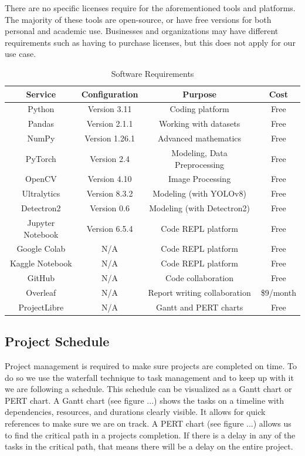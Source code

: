 \documentclass[stu,12pt,floatsintext]{apa7}
\begin{document}
There are no specific licenses require for the aforementioned tools and platforms. The majority of these tools are open-source, or have free versions for both personal and academic use. Businesses and organizations may have different requirements such as having to purchase licenses, but this does not apply for our use case. 

\begin{table}[!htb]
    \centering
    \caption{Software Requirements}
    \begin{tabular}{cccc}
    \hline
         Service& Configuration  &Purpose& Cost \\
         \hline
         Python & Version 3.11  &Coding platform& Free \\
         Pandas & Version 2.1.1  &Working with datasets& Free \\
         NumPy & Version 1.26.1  &Advanced mathematics& Free \\
         PyTorch & Version 2.4& Modeling, Data Preprocessing& Free\\
         OpenCV  & Version 4.10& Image Processing & Free\\
         Ultralytics & Version 8.3.2& Modeling (with YOLOv8)& Free\\
         Detectron2 & Version 0.6& Modeling (with Detectron2)& Free\\
         Jupyter Notebook & Version 6.5.4  &Code REPL platform& Free\\
         Google Colab & N/A  &Code REPL platform& Free\\
         Kaggle Notebook & N/A  &Code REPL platform& Free\\
         GitHub & N/A  &Code collaboration& Free \\
         Overleaf & N/A  &Report writing collaboration& \$9/month \\ 
         ProjectLibre & N/A  &Gantt and PERT charts& Free \\ 
         \hline
    \end{tabular}
    \label{tab:software}
\end{table}

\subsection{Project Schedule}

Project management is required to make sure projects are completed on time. To do so we use the waterfall technique to task management and to keep up with it we are following a schedule. This schedule can be visualized as a Gantt chart or PERT chart. A Gantt chart (see figure ...) shows the tasks on a timeline with dependencies, resources, and durations clearly visible. It allows for quick references to make sure we are on track. A PERT chart (see figure ...) allows us to find the critical path in a projects completion. If there is a delay in any of the tasks in the critical path, that means there will be a delay on the entire project.

\printbibliography

\appendix
\end{document}
